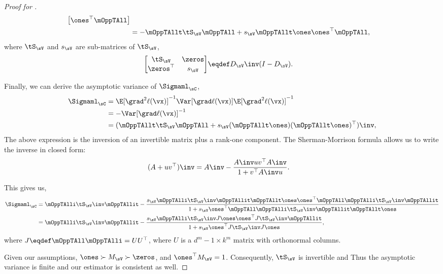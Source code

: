 \begin{proof}[Proof for ]
\begin{align*}
\begin{bmatrix}
        \ones^\top \mOppTAll
      \end{bmatrix} \\
   &=
    - \mOppTAllt \tS_\sV \mOppTAll + s_\sV \mOppTAllt \ones \ones^\top \mOppTAll,
\end{align*}
where $\tS_\sV$ and $s_\sV$ are sub-matrices of $\tS_\sV$, 
\begin{align*}
  \begin{bmatrix}
          \tS_\sV & \zeros \\
          \zeros^\top & s_\sV
  \end{bmatrix}
  &\eqdef D_\sV\inv (I - D_\sV).
\end{align*}

Finally, we can derive the asymptotic variance of $\Sigmaml_\sC$,
\begin{align*}
    \Sigmaml_{\sC} 
      &= \E[\grad^2 \ell(\vx)]^{-1} \Var [\grad \ell(\vx)] \E[\grad^2 \ell(\vx)]^{-1} \\
      &= -\Var[\grad \ell(\vx)]^{-1} \\
      &= (\mOppTAllt \tS_\sV \mOppTAll + s_\sV (\mOppTAllt \ones)(\mOppTAllt \ones)^\top)\inv,
\end{align*}
The above expression is the inversion of an invertible matrix plus a rank-one component. The Sherman-Morrison formula allows us to write the inverse in closed form:
\begin{align*}
  (A + uv^\top)\inv &= A\inv - \frac{A\inv uv^\top A\inv}{1 + v^\top A\inv u}.
\end{align*}

This gives us,
\begin{align}
    \Sigmaml_{\sC} 
    &= \mOppTAlli \tS_\sV\inv \mOppTAllit 
      - \frac{s_\sV \mOppTAlli \tS_\sV\inv \mOppTAllit \mOppTAllt \ones \ones^\top \mOppTAll \mOppTAlli \tS_\sV\inv \mOppTAllit }
      {1 + s_\sV \ones^\top \mOppTAll \mOppTAlli \tS_\sV\inv \mOppTAllit \mOppTAllt \ones} \nonumber \\
    &= \mOppTAlli \tS_\sV\inv \mOppTAllit 
      - \frac{s_\sV \mOppTAlli \tS_\sV\inv J \ones \ones^\top J \tS_\sV\inv \mOppTAllit }
      {1 + s_\sV \ones^\top J \tS_\sV\inv J \ones}, \label{eqn:asymp-var-ml}
\end{align}
where $J \eqdef \mOppTAll \mOppTAlli = U U^\top$, where $U$ is a $d^m
- 1 \times k^m$ matrix with orthonormal columns.

Given our assumptions, $\ones \succ M_\sV \succ \zeros$, and
  $\ones^\top M_\sV = 1$. Consequently, $\tS_\sV$ is invertible and 
Thus the asymptotic variance is finite and our estimator is consistent
  as well. 
\end{proof}

